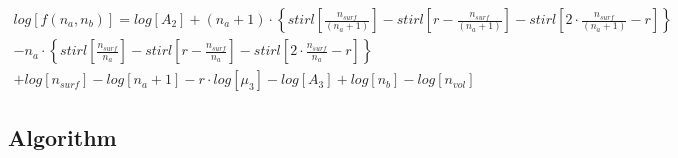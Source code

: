 \documentclass[10pt,letterpaper]{article}
\newcommand{\nads}[1]{
    \ensuremath{
        \frac{
            n_{surf}
        }{
            #1
        }
    }
}
\newcommand{\nlp}[1]{
    \ensuremath{
        r
        -
        \nads{#1}
    }
}
\newcommand{\StirlOFgOFm}[1]{
	\ensuremath{
	#1
	\cdot
	\left\{
    	stirl
    	\left[
    	        \nads{#1}
    	\right]
    	-
    	stirl
    	\left[
        	    \nlp{#1}
    	\right]
    	-
    	stirl
    	\left[
        	    2
        	    \cdot
        	    \nads{#1}
        	    -
        	    r
    	\right]
	\right\}
	}
}
\begin{document}
\begin{multline}
	log
	\left[
	    f(n_a,n_b)
	\right]
	=
	log
	\left[
		A_2
	\right]
	+
	\StirlOFgOFm{(n_a+1)}\\
    -
    \StirlOFgOFm{n_a}\\
	+
	log
	\left[
		n_{surf}
	\right]
		-
		log
		\left[
		n_a+1
		\right]
		-
		r
		\cdot
		log
		\left[
		\mu_{3}
		\right]
		-
		log
		\left[
		A_3
		\right]
		+
		log
		\left[
		n_{b}
		\right]
		-
		log
		\left[
		n_{vol}	
	\right]
		\label{stirlOFexpnd1}
\end{multline}


\subsection{Algorithm}








\end{document}

